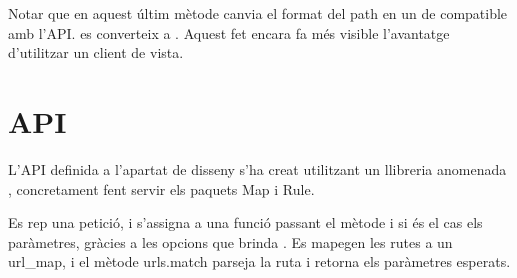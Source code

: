 \documentclass[letterpaper,11pt,catalan]{sphinxmanual}
\begin{document}
\begin{sphinxVerbatim}[commandchars=\\\{\}]
      
           
             \PYG{p}{[}\PYG{p}{]}  
                \PYG{p}{[}\PYG{p}{]}  \PYG{p}{[}\PYG{p}{]} 
          
          
\end{sphinxVerbatim}

Notar que en aquest últim mètode canvia el format del path en un de compatible amb l'API.
 es converteix a . Aquest fet encara fa més visible l'avantatge
d'utilitzar un client de vista.


\section{API}
\label{\detokenize{index:api}}
L'API definida a l'apartat de disseny s'ha creat utilitzant un llibreria anomenada ,
concretament fent servir els paquets Map i Rule.

Es rep una petició, i s'assigna a una funció passant el mètode i si és el cas els paràmetres,
gràcies a les opcions que brinda . Es \sphinxquotedblleft{}mapegen\sphinxquotedblright{} les rutes a un url\_map, i el
mètode urls.match \sphinxquotedblleft{}parseja\sphinxquotedblright{} la ruta i retorna els paràmetres esperats.
\end{document}
